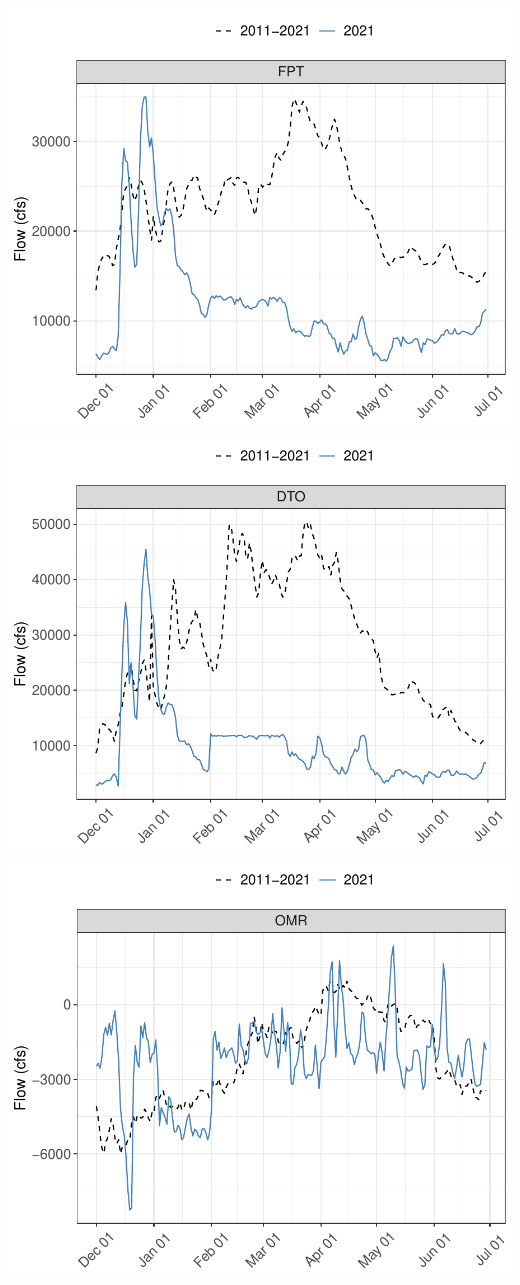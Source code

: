 \documentclass[
]{book}
\theoremstyle{definition}
\theoremstyle{definition}
\theoremstyle{definition}
\theoremstyle{definition}
\theoremstyle{remark}
\begin{document}
\includegraphics{_main_files/figure-latex/FPTflow-fig-1.pdf}
\includegraphics{_main_files/figure-latex/DTOflow-fig-1.pdf}
\includegraphics{_main_files/figure-latex/OMRflow-fig-1.pdf}
\end{document}
